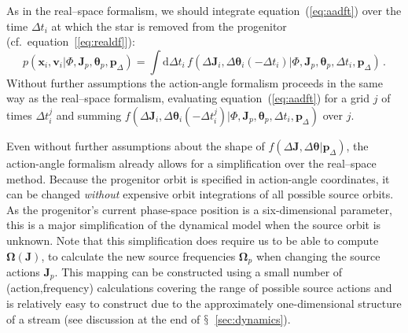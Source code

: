\documentclass[12pt,preprint]{aastex}
\newcommand{\dd}{\mathrm{d}}
\newcommand{\eqnname}{equation}
\newcommand{\sectionname}{$\mathsection$}
\renewcommand{\vec}[1]{\ensuremath{\mathbf{#1}}}
\newcommand{\vecx}{\ensuremath{\vec{x}}}
\newcommand{\vecv}{\ensuremath{\vec{v}}}
\newcommand{\vecj}{\ensuremath{\vec{J}}}
\newcommand{\veco}{\ensuremath{\vec{\Omega}}}
\newcommand{\veca}{\ensuremath{\boldsymbol\theta}}
\newcommand{\paramsdiff}{\ensuremath{\vec{p}_\Delta}}
\begin{document}
As in the real--space formalism, we should integrate
\eqnname~(\ref{eq:aadft}) over the time $\Delta t_i$ at which the star
is removed from the progenitor (cf.~\eqnname~[\ref{eq:realdf}]):
\begin{equation}\label{eq:aadf}
  p(\vecx_i,\vecv_i | \Phi,\vecj_p,\veca_p,\paramsdiff) = \int \dd
  \Delta t_i\, f(\Delta \vecj_i,\Delta \veca_i(-\Delta t_i) |
  \Phi,\vecj_p,\veca_p,\Delta t_i,\paramsdiff) \,.
\end{equation}
Without further assumptions the action-angle formalism proceeds in the
same way as the real--space formalism, evaluating
\eqnname~(\ref{eq:aadft}) for a grid $j$ of times $\Delta t_i^j$ and
summing $f(\Delta \vecj_i,\Delta \veca_i(-\Delta t^j_i) |
\Phi,\vecj_p,\veca_p,\Delta t_i,\paramsdiff)$ over $j$.

Even without further assumptions about the shape of $f(\Delta
\vecj,\Delta \veca|\paramsdiff)$, the action-angle formalism already
allows for a simplification over the real--space method. Because the
progenitor orbit is specified in action-angle coordinates, it can be
changed \emph{without} expensive orbit integrations of all possible
source orbits. As the progenitor's current phase-space position is a
six-dimensional parameter, this is a major simplification of the
dynamical model when the source orbit is unknown. Note that this
simplification does require us to be able to compute $\veco(\vecj)$,
to calculate the new source frequencies $\veco_p$ when changing the
source actions $\vecj_p$. This mapping can be constructed using a
small number of (action,frequency) calculations covering the range of
possible source actions and is relatively easy to construct due to the
approximately one-dimensional structure of a stream (see discussion at
the end of \sectionname~\ref{sec:dynamics}).
\end{document}
